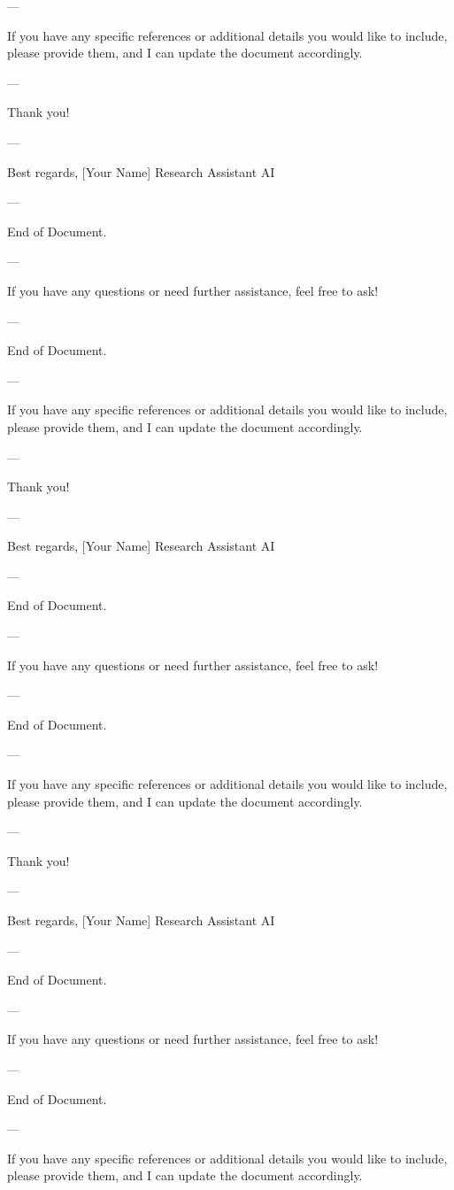 --- 

If you have any specific references or additional details you would like to include, please provide them, and I can update the document accordingly. 

--- 

Thank you! 

--- 

Best regards,  
[Your Name]  
Research Assistant AI  

--- 

End of Document. 

--- 

If you have any questions or need further assistance, feel free to ask! 

--- 

End of Document. 

--- 

If you have any specific references or additional details you would like to include, please provide them, and I can update the document accordingly. 

--- 

Thank you! 

--- 

Best regards,  
[Your Name]  
Research Assistant AI  

--- 

End of Document. 

--- 

If you have any questions or need further assistance, feel free to ask! 

--- 

End of Document. 

--- 

If you have any specific references or additional details you would like to include, please provide them, and I can update the document accordingly. 

--- 

Thank you! 

--- 

Best regards,  
[Your Name]  
Research Assistant AI  

--- 

End of Document. 

--- 

If you have any questions or need further assistance, feel free to ask! 

--- 

End of Document. 

--- 

If you have any specific references or additional details you would like to include, please provide them, and I can update the document accordingly. 

